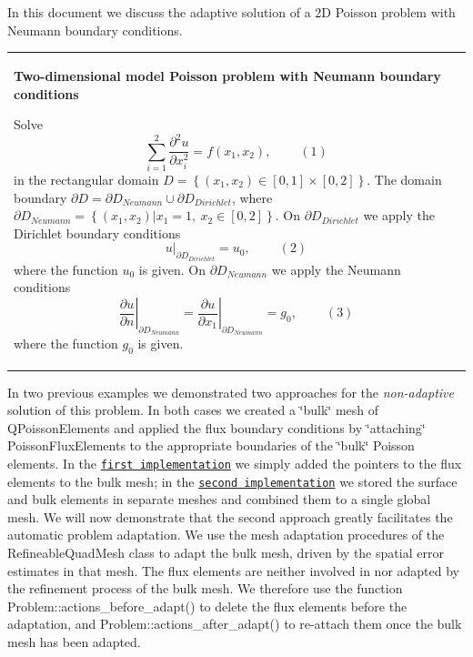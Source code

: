 In this document we discuss the adaptive solution of a 2D Poisson problem with Neumann boundary conditions. \begin{center} \tabulinesep=1mm
\begin{longtabu} spread 0pt [c]{*{1}{|X[-1]}|}
\hline
\begin{center} {\bfseries Two-\/dimensional model Poisson problem with Neumann boundary conditions} \end{center}  Solve \[ \sum_{i=1}^2 \frac{\partial^2u}{\partial x_i^2} = f(x_1,x_2), \ \ \ \ \ \ \ \ \ \ (1) \] in the rectangular domain $D = \left\{ (x_1,x_2) \in [0,1] \times [0,2]\right\} $. The domain boundary $ \partial D = \partial D_{Neumann} \cup \partial D_{Dirichlet} $, where $ \partial D_{Neumann} = \left\{ (x_1,x_2) | x_1=1, \ x_2\in [0,2] \right\} $. On $ \partial D_{Dirichlet}$ we apply the Dirichlet boundary conditions \[ \left. u\right|_{\partial D_{Dirichlet}}=u_0, \ \ \ \ \ \ \ \ \ \ (2) \] where the function $ u_0 $ is given. On $ \partial D_{Neumann}$ we apply the Neumann conditions \[ \left. \frac{\partial u}{\partial n}\right|_{\partial D_{Neumann}} = \left. \frac{\partial u}{\partial x_1}\right|_{\partial D_{Neumann}} =g_0, \ \ \ \ \ \ \ \ \ \ (3) \] where the function $ g_0 $ is given.   \\
\end{longtabu}
\end{center} 

In two previous examples we demonstrated two approaches for the {\itshape non-\/adaptive} solution of this problem. In both cases we created a \char`\"{}bulk\char`\"{} mesh of {\ttfamily Q\+Poisson\+Elements} and applied the flux boundary conditions by \char`\"{}attaching\char`\"{} {\ttfamily Poisson\+Flux\+Elements} to the appropriate boundaries of the \char`\"{}bulk\char`\"{} Poisson elements. In the \href{../../two_d_poisson_flux_bc/html/index.html}{\tt first implementation} we simply added the pointers to the flux elements to the bulk mesh; in the \href{../../two_d_poisson_flux_bc2/html/index.html}{\tt second implementation} we stored the surface and bulk elements in separate meshes and combined them to a single global mesh. We will now demonstrate that the second approach greatly facilitates the automatic problem adaptation. We use the mesh adaptation procedures of the {\ttfamily Refineable\+Quad\+Mesh} class to adapt the bulk mesh, driven by the spatial error estimates in that mesh. The flux elements are neither involved in nor adapted by the refinement process of the bulk mesh. We therefore use the function {\ttfamily Problem\+::actions\+\_\+before\+\_\+adapt()} to delete the flux elements before the adaptation, and {\ttfamily Problem\+::actions\+\_\+after\+\_\+adapt()} to re-\/attach them once the bulk mesh has been adapted.

